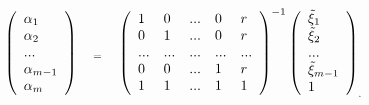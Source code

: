 \documentclass [12pt]{article}
\begin{document}
\[

\left( {{\begin{array}{*{20}c}

 {\alpha _1 } \hfill \\

 {\alpha _2 } \hfill \\

 {...} \hfill \\

 {\alpha _{m - 1} } \hfill \\

 {\alpha _m } \hfill \\

\end{array} }} \right) \quad _{ = }

\quad

\left( {{\begin{array}{*{20}c}

 1 \hfill & 0 \hfill & {...} \hfill & 0 \hfill & r \hfill \\

 0 \hfill & 1 \hfill & {...} \hfill & 0 \hfill & r \hfill \\

 {...} \hfill & {...} \hfill & {...} \hfill & {...} \hfill & {...} \hfill \\

 0 \hfill & 0 \hfill & {...} \hfill & 1 \hfill & r \hfill \\

 1 \hfill & 1 \hfill & {...} \hfill & 1 \hfill & 1 \hfill \\

\end{array} }} \right)^{ - 1}

\left( {{\begin{array}{*{20}c}

 {\tilde {\xi }_1 } \hfill \\

 {\tilde {\xi }_2 } \hfill \\

 {...} \hfill \\

 {\tilde {\xi }_{m - 1} } \hfill \\

 1 \hfill \\

\end{array} }} \right)_{.}

\]
\end{document}
